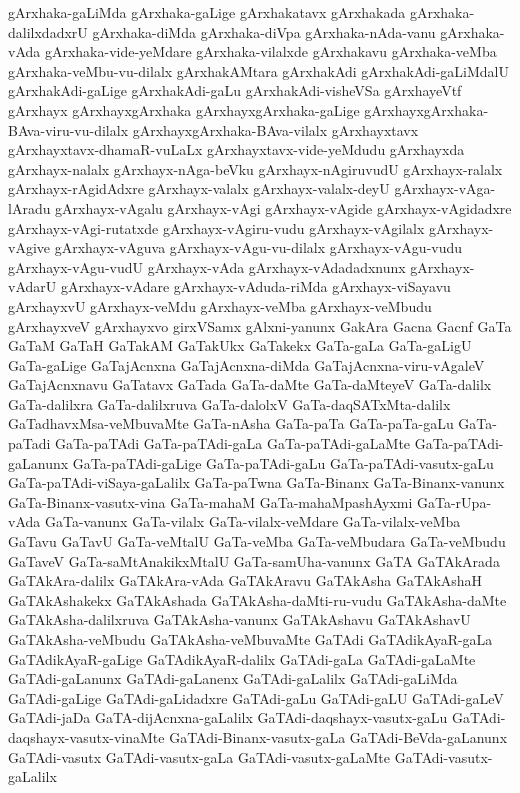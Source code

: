 {gArxhaka-gaLiMda
gArxhaka-gaLige
gArxhakatavx
gArxhakada
gArxhaka-dalilxdadxrU
gArxhaka-diMda
gArxhaka-diVpa
gArxhaka-nAda-vanu
gArxhaka-vAda
gArxhaka-vide-yeMdare
gArxhaka-vilalxde
gArxhakavu
gArxhaka-veMba
gArxhaka-veMbu-vu-dilalx
gArxhakAMtara
gArxhakAdi
gArxhakAdi-gaLiMdalU
gArxhakAdi-gaLige
gArxhakAdi-gaLu
gArxhakAdi-visheVSa
gArxhayeVtf
gArxhayx
gArxhayxgArxhaka
gArxhayxgArxhaka-gaLige
gArxhayxgArxhaka-BAva-viru-vu-dilalx
gArxhayxgArxhaka-BAva-vilalx
gArxhayxtavx
gArxhayxtavx-dhamaR-vuLaLx
gArxhayxtavx-vide-yeMdudu
gArxhayxda
gArxhayx-nalalx
gArxhayx-nAga-beVku
gArxhayx-nAgiruvudU
gArxhayx-ralalx
gArxhayx-rAgidAdxre
gArxhayx-valalx
gArxhayx-valalx-deyU
gArxhayx-vAga-lAradu
gArxhayx-vAgalu
gArxhayx-vAgi
gArxhayx-vAgide
gArxhayx-vAgidadxre
gArxhayx-vAgi-rutatxde
gArxhayx-vAgiru-vudu
gArxhayx-vAgilalx
gArxhayx-vAgive
gArxhayx-vAguva
gArxhayx-vAgu-vu-dilalx
gArxhayx-vAgu-vudu
gArxhayx-vAgu-vudU
gArxhayx-vAda
gArxhayx-vAdadadxnunx
gArxhayx-vAdarU
gArxhayx-vAdare
gArxhayx-vAduda-riMda
gArxhayx-viSayavu
gArxhayxvU
gArxhayx-veMdu
gArxhayx-veMba
gArxhayx-veMbudu
gArxhayxveV
gArxhayxvo
girxVSamx
gAlxni-yanunx
GakAra
Gacna
Gacnf
GaTa
GaTaM
GaTaH
GaTakAM
GaTakUkx
GaTakekx
GaTa-gaLa
GaTa-gaLigU
GaTa-gaLige
GaTajAcnxna
GaTajAcnxna-diMda
GaTajAcnxna-viru-vAgaleV
GaTajAcnxnavu
GaTatavx
GaTada
GaTa-daMte
GaTa-daMteyeV
GaTa-dalilx
GaTa-dalilxra
GaTa-dalilxruva
GaTa-dalolxV
GaTa-daqSATxMta-dalilx
GaTadhavxMsa-veMbuvaMte
GaTa-nAsha
GaTa-paTa
GaTa-paTa-gaLu
GaTa-paTadi
GaTa-paTAdi
GaTa-paTAdi-gaLa
GaTa-paTAdi-gaLaMte
GaTa-paTAdi-gaLanunx
GaTa-paTAdi-gaLige
GaTa-paTAdi-gaLu
GaTa-paTAdi-vasutx-gaLu
GaTa-paTAdi-viSaya-gaLalilx
GaTa-paTwna
GaTa-Binanx
GaTa-Binanx-vanunx
GaTa-Binanx-vasutx-vina
GaTa-mahaM
GaTa-mahaMpashAyxmi
GaTa-rUpa-vAda
GaTa-vanunx
GaTa-vilalx
GaTa-vilalx-veMdare
GaTa-vilalx-veMba
GaTavu
GaTavU
GaTa-veMtalU
GaTa-veMba
GaTa-veMbudara
GaTa-veMbudu
GaTaveV
GaTa-saMtAnakikxMtalU
GaTa-samUha-vanunx
GaTA
GaTAkArada
GaTAkAra-dalilx
GaTAkAra-vAda
GaTAkAravu
GaTAkAsha
GaTAkAshaH
GaTAkAshakekx
GaTAkAshada
GaTAkAsha-daMti-ru-vudu
GaTAkAsha-daMte
GaTAkAsha-dalilxruva
GaTAkAsha-vanunx
GaTAkAshavu
GaTAkAshavU
GaTAkAsha-veMbudu
GaTAkAsha-veMbuvaMte
GaTAdi
GaTAdikAyaR-gaLa
GaTAdikAyaR-gaLige
GaTAdikAyaR-dalilx
GaTAdi-gaLa
GaTAdi-gaLaMte
GaTAdi-gaLanunx
GaTAdi-gaLanenx
GaTAdi-gaLalilx
GaTAdi-gaLiMda
GaTAdi-gaLige
GaTAdi-gaLidadxre
GaTAdi-gaLu
GaTAdi-gaLU
GaTAdi-gaLeV
GaTAdi-jaDa
GaTA-dijAcnxna-gaLalilx
GaTAdi-daqshayx-vasutx-gaLu
GaTAdi-daqshayx-vasutx-vinaMte
GaTAdi-Binanx-vasutx-gaLa
GaTAdi-BeVda-gaLanunx
GaTAdi-vasutx
GaTAdi-vasutx-gaLa
GaTAdi-vasutx-gaLaMte
GaTAdi-vasutx-gaLalilx
}
